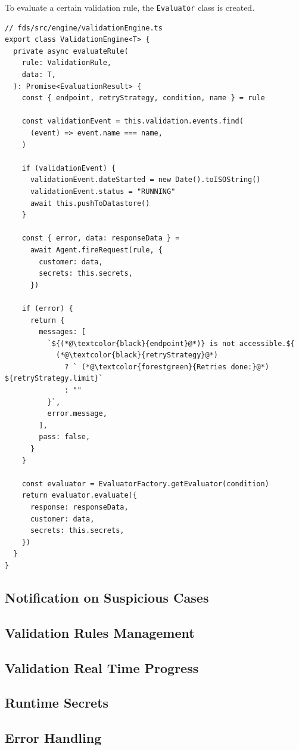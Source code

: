       To evaluate a certain validation rule, the \verb;Evaluator; class is created. 

      \begin{lstlisting}[style=es6, caption={Rule evaluation in ValidationEngine (TypeScript)}]
// fds/src/engine/validationEngine.ts
export class ValidationEngine<T> {
  private async evaluateRule(
    rule: ValidationRule,
    data: T,
  ): Promise<EvaluationResult> {
    const { endpoint, retryStrategy, condition, name } = rule

    const validationEvent = this.validation.events.find(
      (event) => event.name === name,
    )
    
    if (validationEvent) {
      validationEvent.dateStarted = new Date().toISOString()
      validationEvent.status = "RUNNING"
      await this.pushToDatastore()
    }

    const { error, data: responseData } =
      await Agent.fireRequest(rule, {
        customer: data,
        secrets: this.secrets,
      })

    if (error) {
      return {
        messages: [
          `${(*@\textcolor{black}{endpoint}@*)} is not accessible.${
            (*@\textcolor{black}{retryStrategy}@*)
              ? ` (*@\textcolor{forestgreen}{Retries done:}@*) ${retryStrategy.limit}`
              : ""
          }`,
          error.message,
        ],
        pass: false,
      }
    }

    const evaluator = EvaluatorFactory.getEvaluator(condition)
    return evaluator.evaluate({
      response: responseData,
      customer: data,
      secrets: this.secrets,
    })
  }
}
      \end{lstlisting}

  \subsection{Notification on Suspicious Cases}

  \subsection{Validation Rules Management}

  \subsection{Validation Real Time Progress}

  \subsection{Runtime Secrets}
    \label{sub:secrets} 

  \subsection{Error Handling}

